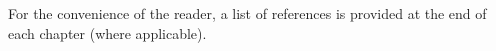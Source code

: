 
%
\ifperchapterbib%
For the convenience of the reader, a list of references is provided at the end of each chapter (where applicable).
\ifendbib%
\else\fi%
\else\fi%
